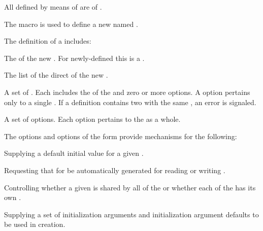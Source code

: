 \itemitem{\bull}                     
All  defined by means of  are
 of .
\endlist

\endsubsubsection%

           
The macro  is used to define a new named .  

The definition of a  includes:

\beginlist

\itemitem{\bull} The  of the new . 
  For newly-defined  this  is a .

\itemitem{\bull} The list of the direct  of the new . 

\itemitem{\bull} A set of .
  Each  includes the  of the  
  and zero or more  options.  A  option pertains 
  only to a single .  If a  definition contains
  two  with the same , an error is signaled.

\itemitem{\bull} A set of  options.  
  Each  option pertains to the  as a whole.  

\endlist
                                              
The  options and  options of 
the  form provide mechanisms for the following:

\beginlist

\itemitem{\bull} Supplying a default initial value  
for a given .  

\itemitem{\bull} Requesting that  for 
be automatically generated for reading or writing . 

\itemitem{\bull} Controlling whether a given  is shared by 
all 
of the  or whether each 
 of the  has its own .

\itemitem{\bull} Supplying a set of initialization arguments and initialization
argument defaults to be used in  creation.


